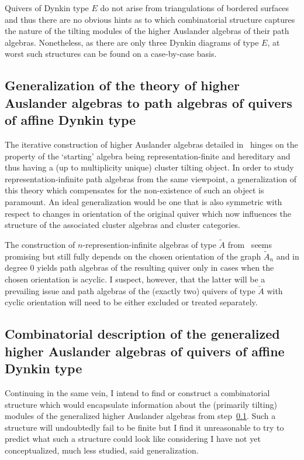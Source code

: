 \documentclass[a4paper,oneside,svgnames]{amsart}
\theoremstyle{plain}
\theoremstyle{definition}
\begin{document}
 Quivers of Dynkin type $E$ do not arise from triangulations of bordered
 surfaces and thus there are no obvious hints as to which combinatorial
 structure captures the nature of the tilting modules of the higher Auslander
 algebras of their path algebras. Nonetheless, as there are only three Dynkin
 diagrams of type $E$, at worst such structures can be found on a case-by-case
 basis.

 \subsection{Generalization of the theory of higher Auslander algebras to path
 algebras of quivers of affine Dynkin type}
 \label{step-2}

 The iterative construction of higher Auslander algebras detailed in~\cite{iya}
 hinges on the property of the `starting' algebra being representation-finite
 and hereditary and thus having a (up to multiplicity unique) cluster tilting
 object. In order to study representation-infinite path algebras from the same
 viewpoint, a generalization of this theory which compensates for the
 non-existence of such an object is paramount. An ideal generalization would be
 one that is also symmetric with respect to changes in orientation of the
 original quiver which now influences the structure of the associated cluster
 algebras and cluster categories.

 The construction of $n$-represention-infinite algebras of type $\tilde{A}$
 from~\cite[Section~5]{hio} seems promising but still fully depends on the
 chosen orientation of the graph $\tilde{A}_n$ and in degree 0 yields path
 algebras of the resulting quiver only in cases when the chosen orientation is
 acyclic. I suspect, however, that the latter will be a prevailing issue and
 path algebras of the (exactly two) quivers of type $\tilde{A}$ with cyclic
 orientation will need to be either excluded or treated separately.

 \subsection{Combinatorial description of the generalized higher Auslander
 algebras of quivers of affine Dynkin type}
 \label{step-3}

 Continuing in the same vein, I intend to find or construct a combinatorial
 structure which would encapsulate information about the (primarily tilting)
 modules of the generalized higher Auslander algebras from step~\ref{step-2}.
 Such a structure will undoubtedly fail to be finite but I find it unreasonable
 to try to predict what such a structure could look like considering I have not
 yet conceptualized, much less studied, said generalization.
\end{document}
